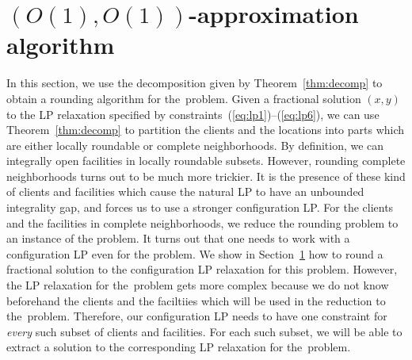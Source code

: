 
\section{$(O(1), O(1))$-approximation algorithm}
In this section, we use the decomposition given by Theorem~\ref{thm:decomp} to obtain a rounding algorithm for the~\mckc problem. Given 
a fractional solution $(x,y)$ to the LP relaxation specified by constraints~(\ref{eq:lp1})--(\ref{eq:lp6}), we can use Theorem~\ref{thm:decomp} to partition 
the clients and the locations into parts which are either  locally roundable or complete neighborhoods. By definition, we can integrally open facilities
in locally roundable subsets. However, rounding complete neighborhoods turns out to be much more trickier. It is the presence of these kind of clients
and facilities which cause the natural LP to have an unbounded integrality gap, and forces us to use a stronger configuration LP.  For the clients
and the facilities in complete neighborhoods, we reduce the rounding problem to an instance of the \cckp problem. It turns out that one needs
to work with a configuration LP even for the \cckp problem. We show in Section~\ref{} how to round a fractional solution to the configuration LP 
relaxation for this problem. However, the LP relaxation for the~\mckc problem gets more complex because we do not know beforehand the 
clients and the faciltiies which will be used in the reduction to the~\cckp problem. Therefore, our configuration LP needs to have one constraint
for {\em every} such subset of clients and facilities. For each such subset, we will be able to extract a solution to the corresponding LP relaxation 
for the~\cckp problem. 

